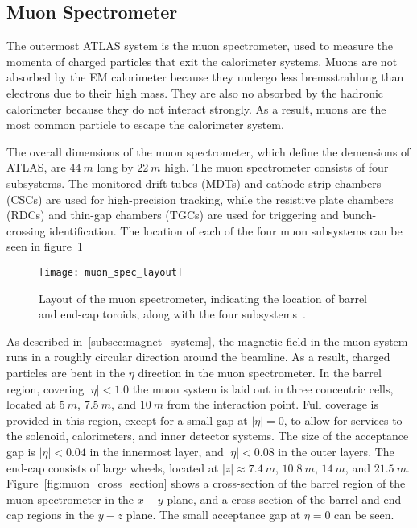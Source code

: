 \subsection{Muon Spectrometer}\label{subsec:muon_spec}

The outermost ATLAS system is the muon spectrometer, used to measure the momenta of charged particles that exit the calorimeter systems.
Muons are not absorbed by the EM calorimeter because they undergo less bremsstrahlung than electrons due to their high mass.
They are also no absorbed by the hadronic calorimeter because they do not interact strongly.
As a result, muons are the most common particle to escape the calorimeter system.

The overall dimensions of the muon spectrometer, which define the demensions of ATLAS, are $44~m$ long by $22~m$ high.
The muon spectrometer consists of four subsystems.
The monitored drift tubes (MDTs) and cathode strip chambers (CSCs) are used for high-precision tracking,
while the resistive plate chambers (RDCs) and thin-gap chambers (TGCs) are used for triggering and bunch-crossing identification.
The location of each of the four muon subsystems can be seen in figure~\ref{fig:muon_spec_layout}

\begin{figure}[!ht]\centering
\texttt{[image: muon\_spec\_layout]}
\caption{Layout of the muon spectrometer, indicating the location of barrel and end-cap toroids, along with the four subsystems~\cite{atlas-detector-2008}.}
\label{fig:muon_spec_layout}
\end{figure}

As described in~\ref{subsec:magnet_systems}, the magnetic field in the muon system runs in a roughly circular direction around the beamline.
As a result, charged particles are bent in the $\eta$ direction in the muon spectrometer.
In the barrel region, covering $|\eta| < 1.0$ the muon system is laid out in three concentric cells, located at $5~m$, $7.5~m$, and $10~m$ from the interaction point.
Full coverage is provided in this region, except for a small gap at $|\eta| = 0$, to allow for services to the solenoid, calorimeters, and inner detector systems.
The size of the acceptance gap is $|\eta| < 0.04$ in the innermost layer, and $|\eta| < 0.08$ in the outer layers.
The end-cap consists of large wheels, located at $|z| \approx 7.4~m$, $10.8~m$, $14~m$, and $21.5~m$.
Figure~\ref{fig:muon_cross_section} shows a cross-section of the barrel region of the muon spectrometer in the $x-y$ plane, and a cross-section of the barrel and end-cap regions in the $y-z$ plane.
The small acceptance gap at $\eta = 0$ can be seen.

